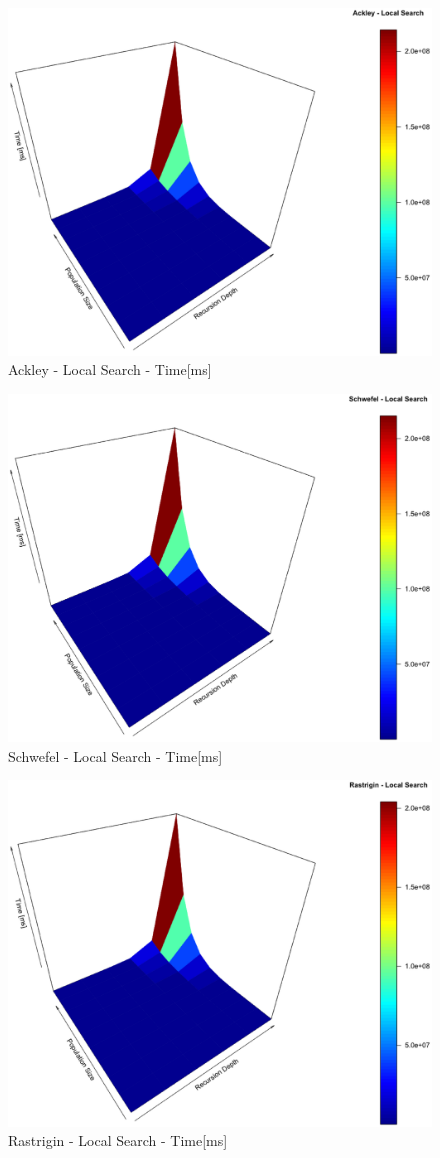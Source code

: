 \documentclass{svproc}
\begin{document}
\begin{figure}[tbp]
\centering
\includegraphics[width=1.0\hsize,height=0.65\hsize]{fig05.eps}
\caption{Ackley - Local Search - Time[ms]}
\label{fig12}
\end{figure}

\begin{figure}[tbp]
\centering
\includegraphics[width=1.0\hsize,height=0.65\hsize]{fig08.eps}
\caption{Schwefel - Local Search - Time[ms]}
\label{fig13}
\end{figure}

\begin{figure}[tbp]
\centering
\includegraphics[width=1.0\hsize,height=0.65\hsize]{fig11.eps}
\caption{Rastrigin - Local Search - Time[ms]}
\label{fig14}
\end{figure}
\end{document}
